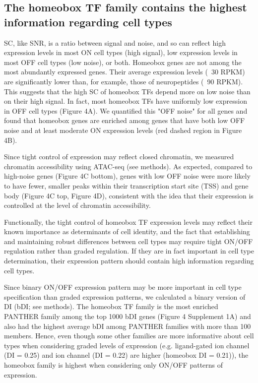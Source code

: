 \subsection{The homeobox TF family contains the highest information regarding cell types}

SC, like SNR, is a ratio between signal and noise, and so can reflect high expression levels in most ON cell types (high signal), low expression levels in most OFF cell types (low noise), or both. Homeobox genes are not among the most abundantly expressed genes. Their average expression levels (~30 RPKM) are significantly lower than, for example, those of neuropeptides (~90 RPKM). This suggests that the high SC of homeobox TFs depend more on low noise than on their high signal. In fact, most  homeobox TFs have uniformly low expression in OFF cell types (Figure 4A). We quantified this "OFF noise" for all genes and found that homeobox genes are enriched among genes that have both low OFF noise and at least moderate ON expression levels (red dashed region in Figure 4B).

Since tight control of expression may reflect closed chromatin, we measured chromatin accessibility using ATAC-seq (see methods). As expected, compared to high-noise genes (Figure 4C bottom), genes with low OFF noise were more likely to have fewer, smaller peaks within their transcription start site (TSS) and gene body (Figure 4C top, Figure 4D), consistent with the idea that their expression is controlled at the level of chromatin accessibility.

Functionally, the tight control of homeobox TF expression levels may reflect their known importance as determinants of cell identity, and the fact that establishing and maintaining robust differences between cell types may require tight ON/OFF regulation rather than graded regulation. If they are in fact important in cell type determination, their expression pattern should contain high information regarding cell types. 

Since binary ON/OFF expression pattern may be more important in cell type specification than graded expression patterns, we calculated a binary version of DI (bDI; see methods). The homeobox TF family is the most enriched PANTHER family among the top 1000 bDI genes (Figure 4 Supplement 1A) and also had the highest average bDI among PANTHER families with more than 100 members. Hence, even though some other families are more informative about cell types when considering graded levels of expression (e.g. ligand-gated ion channel (DI = 0.25) and ion channel (DI = 0.22) are higher (homeobox DI = 0.21)), the homeobox family is highest when considering only ON/OFF patterns of expression.  

